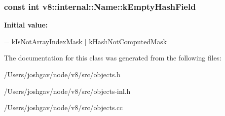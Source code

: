 \subsubsection[{\texorpdfstring{k\+Empty\+Hash\+Field}{kEmptyHashField}}]{\setlength{\rightskip}{0pt plus 5cm}const int v8\+::internal\+::\+Name\+::k\+Empty\+Hash\+Field\hspace{0.3cm}{\ttfamily [static]}}\hypertarget{classv8_1_1internal_1_1_name_a2a35367ed3cb3999a8e6d3d46680b816}{}\label{classv8_1_1internal_1_1_name_a2a35367ed3cb3999a8e6d3d46680b816}
{\bfseries Initial value\+:}
\begin{DoxyCode}
=
      kIsNotArrayIndexMask | kHashNotComputedMask
\end{DoxyCode}


The documentation for this class was generated from the following files\+:\begin{DoxyCompactItemize}
\item 
/\+Users/joshgav/node/v8/src/objects.\+h\item 
/\+Users/joshgav/node/v8/src/objects-\/inl.\+h\item 
/\+Users/joshgav/node/v8/src/objects.\+cc\end{DoxyCompactItemize}

